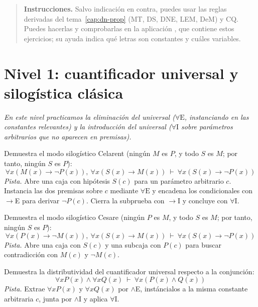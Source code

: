 \begin{quote}
\small \textbf{Instrucciones.} Salvo indicación en contra, puedes usar las reglas derivadas del tema~\ref{cap:dn-prop} (MT, DS, DNE, LEM, DeM) y CQ. Puedes hacerlas y comprobarlas en la aplicación \appdeduccion{}, que contiene estos ejercicios; su ayuda indica qué letras son constantes y cuáles variables.
\end{quote}

\section*{Nivel 1: cuantificador universal y silogística clásica}
\textit{En este nivel practicamos la eliminación del universal ($\forall\text{E}$, instanciando en las constantes relevantes) y la introducción del universal ($\forall\text{I}$ sobre parámetros arbitrarios que no aparecen en premisas).}

\begin{pregunta}\label{e4-1}
Demuestra el modo silogístico Celarent (ningún $M$ es $P$, y todo $S$ es $M$; por tanto, ningún $S$ es $P$):
\[
\forall x (M(x) \to \neg P(x)), \ \forall x (S(x) \to M(x)) \ \vdash \ \forall x (S(x) \to \neg P(x))
\]
\textit{Pista.} Abre una caja con hipótesis $S(c)$ para un parámetro arbitrario $c$. Instancia las dos premisas sobre $c$ mediante $\forall\text{E}$ y encadena los condicionales con $\to$E para derivar $\neg P(c)$. Cierra la subprueba con $\to$I y concluye con $\forall\text{I}$.
\end{pregunta}

\begin{pregunta}\label{e4-2}
Demuestra el modo silogístico Cesare (ningún $P$ es $M$, y todo $S$ es $M$; por tanto, ningún $S$ es $P$):
\[
\forall x (P(x) \to \neg M(x)), \ \forall x (S(x) \to M(x)) \ \vdash \ \forall x (S(x) \to \neg P(x))
\]
\textit{Pista.} Abre una caja con $S(c)$ y una subcaja con $P(c)$ para buscar contradicción con $M(c)$ y $\neg M(c)$.
\end{pregunta}

\begin{pregunta}\label{e4-3}
Demuestra la distributividad del cuantificador universal respecto a la conjunción:
\[
\forall x P(x) \land \forall x Q(x) \ \vdash \ \forall x (P(x) \land Q(x))
\]
\textit{Pista.} Extrae $\forall x P(x)$ y $\forall x Q(x)$ por $\land$E, instáncialos a la misma constante arbitraria $c$, junta por $\land$I y aplica $\forall\text{I}$.
\end{pregunta}

